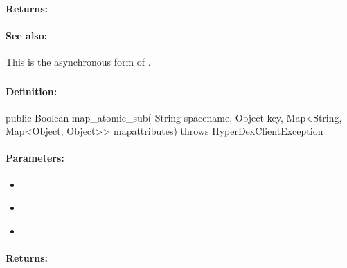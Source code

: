 \paragraph{Returns:}


\paragraph{See also:}  This is the asynchronous form of .

\pagebreak
\subsubsection{}
\label{api:java:map_atomic_sub}


\paragraph{Definition:}
\begin{javacode}
public Boolean map_atomic_sub(
        String spacename,
        Object key,
        Map<String, Map<Object, Object>> mapattributes) throws HyperDexClientException
\end{javacode}

\paragraph{Parameters:}
\begin{itemize}[noitemsep]
\item {}\\

\item {}\\

\item {}\\

\end{itemize}

\paragraph{Returns:}


